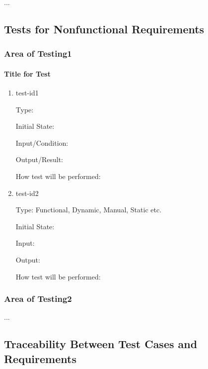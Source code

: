 \documentclass[12pt]{article}
\begin{document}
...

\subsection{Tests for Nonfunctional Requirements}



\subsubsection{Area of Testing1}
		
\paragraph{Title for Test}

\begin{enumerate}

\item{test-id1\\}

Type: 
					
Initial State: 
					
Input/Condition: 
					
Output/Result: 
					
How test will be performed: 
					
\item{test-id2\\}

Type: Functional, Dynamic, Manual, Static etc.
					
Initial State: 
					
Input: 
					
Output: 
					
How test will be performed: 

\end{enumerate}

\subsubsection{Area of Testing2}

...

\subsection{Traceability Between Test Cases and Requirements}
\end{document}
